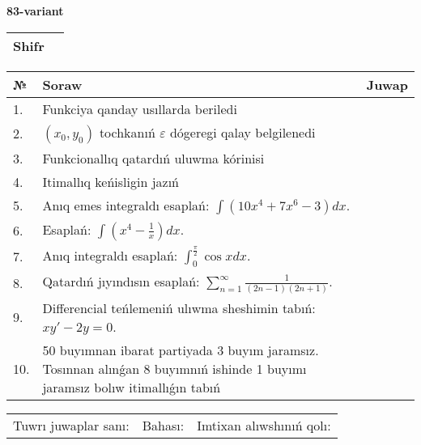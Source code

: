 \documentclass{article}
\begin{document}
  \egroup
  
  \newpage
  
  
  \textbf{83-variant}\\
  
  \bgroup
  \def\arraystretch{1.6} %
  
  \begin{tabular}{|m{5.7cm}|m{9.5cm}|}
  \hline
  Shifr & \\
  \hline
  \end{tabular}
  
  \vspace{1cm}
  
  \begin{tabular}{|m{0.7cm}|m{10cm}|m{4cm}|}
  \hline
  № & Soraw & Juwap \\
  \hline
  1. & Funkciya qanday usıllarda beriledi &  \\
  \hline
  2. & \((x_0,y_0)\) tochkanıń \(\varepsilon\) dógeregi qalay belgilenedi &  \\
  \hline
  3. & Funkcionallıq qatardıń uluwma kórinisi &  \\
  \hline
  4. & Itimallıq keńisligin jazıń &  \\
  \hline
  5. & Anıq emes integraldı esaplań: \(\int{\left( 10x^{4} + 7x^{6} - 3 \right)dx}\). &  \\
  \hline
  6. & Esaplań: \(\int\left( x^{4} - \frac{1}{x} \right)dx\). &  \\
  \hline
  7. & Anıq integraldı esaplań: \(\int_{0}^{\frac{\pi}{2}}{\cos xdx}\). &  \\
  \hline
  8. & Qatardıń jıyındısın esaplań: \(\sum_{n = 1}^{\infty}\frac{1}{(2n - 1)(2n + 1)}\). &  \\
  \hline
  9. & Differencial teńlemeniń ulıwma sheshimin tabıń: \(xy' - 2y = 0\). &  \\
  \hline
  10. & 50 buyımnan ibarat partiyada 3 buyım jaramsız. Tosınnan alınǵan 8 buyımnıń ishinde 1 buyımı jaramsız bolıw itimallıǵın tabıń &  \\
  \hline
  \end{tabular}
  
  \vspace{1cm}
  
  \begin{tabular}{lll}
  Tuwrı juwaplar sanı: \underline{\hspace{1.5cm}} & 
  Bahası: \underline{\hspace{1.5cm}} & 
  Imtixan alıwshınıń qolı: \underline{\hspace{2cm}} \\
  \end{tabular}
  
\end{document}
